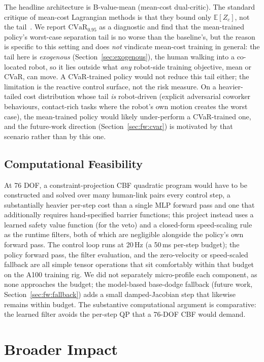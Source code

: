 \documentclass[11pt,a4paper]{report}
\newcommand{\cvar}{\ensuremath{\mathrm{CVaR}}}
\begin{document}
The headline architecture is B-value-mean (mean-cost dual-critic).
The standard critique of mean-cost Lagrangian methods is that they
bound only $\mathbb{E}[Z_c]$, not the tail~\cite{yang2021wcsac}. We
report $\cvar_{0.95}$ as a diagnostic and find that the mean-trained
policy's worst-case separation tail is no worse than the baseline's,
but the reason is specific to this setting and does \emph{not} vindicate
mean-cost training in general: the tail here is \emph{exogenous}
(Section~\ref{sec:exogenous}), the human walking into a co-located
robot, so it lies outside what \emph{any} robot-side training
objective, mean or CVaR, can move. A CVaR-trained policy would not
reduce this tail either; the limitation is the reactive control
surface, not the risk measure. On a heavier-tailed cost distribution
whose tail \emph{is} robot-driven (explicit adversarial coworker
behaviours, contact-rich tasks where the robot's own motion creates
the worst case), the mean-trained policy would likely under-perform a
CVaR-trained one, and the future-work direction
(Section~\ref{sec:fw:cvar}) is motivated by that scenario rather than
by this one.

\subsection{Computational Feasibility}
\label{sec:disc:compute}

At 76 DOF, a constraint-projection CBF quadratic program would have to
be constructed and solved over many human-link pairs every control
step, a substantially heavier per-step cost than a single MLP forward
pass and one that additionally requires hand-specified barrier
functions; this project instead uses a learned safety value function
(for the veto) and a closed-form speed-scaling rule as the runtime
filters, both of which are negligible alongside the policy's own
forward pass. The control loop runs at 20\,Hz (a 50\,ms per-step
budget); the policy forward pass, the filter evaluation, and the
zero-velocity or speed-scaled fallback are all simple tensor
operations that sit comfortably within that budget on the A100
training rig. We did not separately micro-profile each component, as
none approaches the budget; the model-based base-dodge fallback
(future work, Section~\ref{sec:fw:fallback}) adds a small
damped-Jacobian step that likewise remains within budget. The
substantive computational argument is comparative: the learned filter
avoids the per-step QP that a 76-DOF CBF would demand.

\section{Broader Impact}
\label{sec:disc:broader}
\end{document}
